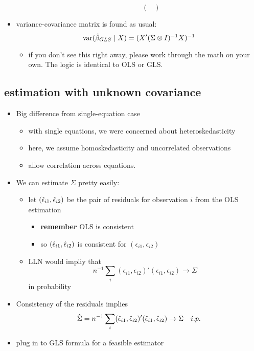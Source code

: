 \begin{itemize}
\begin{itemize}
\begin{itemize}
\[\begin{pmatrix}
  \end{pmatrix} \]
\end{itemize}
\end{itemize}
\item variance-covariance matrix is found as usual:
  \[\operatorname{var}(\hat{\beta}_{GLS} \mid X) = (X'(\Sigma \otimes I)^{-1}X)^{-1}\]
\begin{itemize}
\item if you don't see this right away, please work through the
         math on your own.  The logic is identical to OLS or GLS.
\end{itemize}
\end{itemize}

\subsection{estimation with unknown covariance}

\begin{itemize}
\item Big difference from single-equation case
\begin{itemize}
\item with single equations, we were concerned about heteroskedasticity
\item here, we assume homoskedasticity and uncorrelated observations
\item allow correlation across equations.
\end{itemize}
\item We can estimate $\Sigma$ pretty easily:
\begin{itemize}
\item let $(\hat{\epsilon}_{i1}, \hat{\epsilon}_{i2})$ be the pair of
         residuals for observation $i$ from the OLS estimation
\begin{itemize}
\item \textbf{remember} OLS is consistent
\item so $(\hat{\epsilon}_{i1}, \hat{\epsilon}_{i2})$ is consistent for $(\epsilon_{i1}, \epsilon_{i2})$
\end{itemize}
\item LLN would impliy that
  \[ n^{-1} \sum_i (\epsilon_{i1}, \epsilon_{i2})' (\epsilon_{i1}, \epsilon_{i2}) \to \Sigma\] in
  probability
\end{itemize}
\item Consistency of the residuals implies
  \[\hat{\Sigma} = n^{-1} \sum_i (\hat{\epsilon}_{i1}, \hat{\epsilon}_{i2})'(\hat{\epsilon}_{i1},\hat \epsilon_{i2})\to \Sigma
  \quad i.p.\]
\item plug in to GLS formula for a feasible estimator
\end{itemize}

